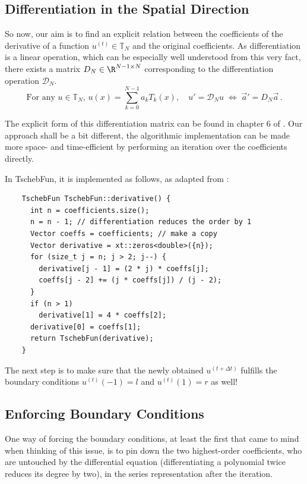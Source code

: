 \documentclass[12pt, a4paper]{article}
\newcommand{\tschebfun}{\textcolor{themecolor3}{TschebFun}\xspace}
\begin{document}
  \subsection{Differentiation in the Spatial Direction}
  So now, our aim is to find an explicit relation between the coefficients of the derivative of a function $u^{(t)} \in \mathbb{T}_N$ and the original coefficients.
  As differentiation is a linear operation, which can be especially well understood from this very fact, there exists a matrix $D_N \in \R^{N-1 \times N}$ corresponding to the differentiation operation $\mathcal{D}_N$.
  $$\text{For any } u \in \mathbb{T}_N,\, u(x) = \sum_{k=0}^{N-1} a_k T_k(x), \quad u' = \mathcal{D}_N u \;\Leftrightarrow\; \vec{a}' = D_N \vec{a} \,.$$

  The explicit form of this differentiation matrix can be found in chapter 6 of \cite{spectralmethods}.
  Our approach shall be a bit different, the algorithmic implementation can be made more space- and time-efficient by performing an iteration over the coefficients directly.

  In \tschebfun, it is implemented as follows, as adapted from \cite{numpy}:
  \begin{verbatim}
    TschebFun TschebFun::derivative() {
      int n = coefficients.size();
      n = n - 1; // differentiation reduces the order by 1
      Vector coeffs = coefficients; // make a copy
      Vector derivative = xt::zeros<double>({n});
      for (size_t j = n; j > 2; j--) {
        derivative[j - 1] = (2 * j) * coeffs[j];
        coeffs[j - 2] += (j * coeffs[j]) / (j - 2);
      }
      if (n > 1)
        derivative[1] = 4 * coeffs[2];
      derivative[0] = coeffs[1];
      return TschebFun(derivative);
    }
  \end{verbatim}

  The next step is to make sure that the newly obtained $u^{(t+\Delta t)}$ fulfills the boundary conditions $u^{(t)}(-1) = l$ and $u^{(t)}(1) = r$ as well!

  \subsection{Enforcing Boundary Conditions}
  One way of forcing the boundary conditions, at least the first that came to mind when thinking of this issue, is to pin down the two highest-order coefficients, who are untouched by the differential equation (differentiating a polynomial twice reduces its degree by two), in the series representation after the iteration.
\end{document}
